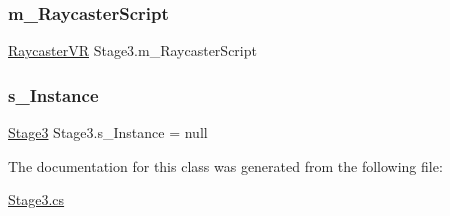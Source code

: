 \mbox{\label{class_stage3_a5c4d1688c502ea8bd4c753b2218c4007}} 
\subsubsection{\texorpdfstring{m\+\_\+\+Raycaster\+Script}{m\_RaycasterScript}}
{\footnotesize\ttfamily \mbox{\hyperlink{class_v_r_standard_assets_1_1_utils_1_1_raycaster_v_r}{Raycaster\+VR}} Stage3.\+m\+\_\+\+Raycaster\+Script\hspace{0.3cm}{\ttfamily [private]}}

\mbox{\label{class_stage3_ad7d6de393aa63c520bcbf0385ace2217}} 
\subsubsection{\texorpdfstring{s\+\_\+\+Instance}{s\_Instance}}
{\footnotesize\ttfamily \mbox{\hyperlink{class_stage3}{Stage3}} Stage3.\+s\+\_\+\+Instance = null\hspace{0.3cm}{\ttfamily [static]}}



The documentation for this class was generated from the following file\+:\begin{DoxyCompactItemize}
\item 
\mbox{\hyperlink{_stage3_8cs}{Stage3.\+cs}}\end{DoxyCompactItemize}
